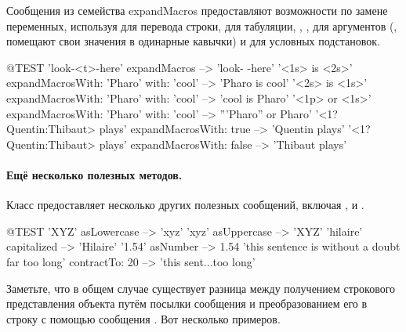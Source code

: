 \documentclass[a4paper,10pt,twoside]{book}
\begin{document}
Сообщения из семейства expandMacros предоставляют возможности по замене переменных, используя  для перевода строки,  для табуляции, , ,  для аргументов (,  помещают свои значения в одинарные кавычки) и  для условных подстановок.

\begin{code}{@TEST}
'look-<t>-here' expandMacros                                         --> 'look-	-here'
'<1s> is <2s>' expandMacrosWith: 'Pharo' with: 'cool'   --> 'Pharo is cool'
'<2s> is <1s>' expandMacrosWith: 'Pharo' with: 'cool'   --> 'cool is Pharo'
'<1p> or <1s>' expandMacrosWith: 'Pharo' with: 'cool'  --> '''Pharo'' or Pharo'
'<1?Quentin:Thibaut> plays' expandMacrosWith: true     --> 'Quentin plays'
'<1?Quentin:Thibaut> plays' expandMacrosWith: false    --> 'Thibaut plays'
\end{code}

\paragraph{Ещё несколько полезных методов.}
Класс  предоставляет несколько других полезных сообщений, включая ,  и . 

\begin{code}{@TEST}
'XYZ' asLowercase --> 'xyz'
'xyz' asUppercase   --> 'XYZ'
'hilaire' capitalized   --> 'Hilaire'
'1.54' asNumber      --> 1.54
'this sentence is without a doubt far too long' contractTo: 20 --> 'this sent...too long'
\end{code}

Заметьте, что в общем случае существует разница между получением строкового представления объекта путём посылки сообщения  и преобразованием его в строку с помощью сообщения .
Вот несколько примеров.
\end{document}
